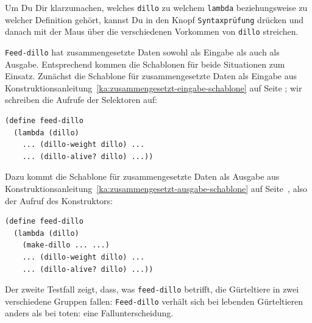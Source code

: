 \begin{aufgabeinline}
  Um Du Dir klarzumachen, welches \texttt{dillo} zu welchem
  \texttt{lambda} beziehungsweise zu welcher Definition gehört, kannst
  Du in \drscheme{} den Knopf \texttt{Syntaxprüfung} drücken und
  danach mit der Maus über die verschiedenen Vorkommen von
  \texttt{dillo} streichen.
\end{aufgabeinline}
%
\texttt{Feed-dillo} hat zusammengesetzte Daten sowohl als Eingabe
als auch als Ausgabe.  Entsprechend kommen die Schablonen für beide
Situationen zum Einsatz.  Zunächst die Schablone für zusammengesetzte
Daten als Eingabe aus
Konstruktionsanleitung~\ref{ka:zusammengesetzt-eingabe-schablone} auf
Seite \pageref{ka:zusammengesetzt-eingabe-schablone}; wir schreiben die Aufrufe der Selektoren auf:
%
\begin{verbatim}
(define feed-dillo
  (lambda (dillo)
    ... (dillo-weight dillo) ...
    ... (dillo-alive? dillo) ...))
\end{verbatim}
%
Dazu kommt die Schablone für zusammengesetzte Daten als Ausgabe aus
Konstruktionsanleitung~\ref{ka:zusammengesetzt-ausgabe-schablone} auf
Seite~\pageref{ka:zusammengesetzt-ausgabe-schablone}, also
der Aufruf des Konstruktors:
%
\begin{verbatim}
(define feed-dillo
  (lambda (dillo)
    (make-dillo ... ...)
    ... (dillo-weight dillo) ...
    ... (dillo-alive? dillo) ...))
\end{verbatim}
%
Der zweite Testfall zeigt, dass, was \texttt{feed-dillo}
betrifft, die Gürteltiere in zwei verschiedene Gruppen fallen:
\texttt{Feed-dillo} verhält sich bei lebenden Gürteltieren anders als
bei toten: eine Fallunterscheidung.

